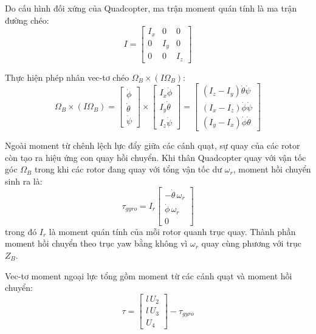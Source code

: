 \documentclass[12pt,a4paper]{report}
\begin{document}
Do cấu hình đối xứng của Quadcopter, ma trận moment quán tính là ma trận đường chéo:
\begin{equation}
I = \begin{bmatrix} I_x & 0 & 0 \\ 0 & I_y & 0 \\ 0 & 0 & I_z \end{bmatrix}
\end{equation}

Thực hiện phép nhân vec-tơ chéo $\Omega_B \times (I \Omega_B)$:
\begin{equation}
\Omega_B \times (I \Omega_B) = \begin{bmatrix} \dot{\phi} \\ \dot{\theta} \\ \dot{\psi} \end{bmatrix} \times \begin{bmatrix} I_x \dot{\phi} \\ I_y \dot{\theta} \\ I_z \dot{\psi} \end{bmatrix} = \begin{bmatrix} (I_z - I_y) \dot{\theta} \dot{\psi} \\ (I_x - I_z) \dot{\phi} \dot{\psi} \\ (I_y - I_x) \dot{\phi} \dot{\theta} \end{bmatrix}
\end{equation}

Ngoài moment từ chênh lệch lực đẩy giữa các cánh quạt, sự quay của các rotor còn tạo ra hiệu ứng con quay hồi chuyển. Khi thân Quadcopter quay với vận tốc góc $\Omega_B$ trong khi các rotor đang quay với tổng vận tốc dư $\omega_r$, moment hồi chuyển sinh ra là:
\begin{equation}
\tau_{gyro} = I_r \begin{bmatrix} -\dot{\theta} \, \omega_r \\[6pt] \dot{\phi} \, \omega_r \\[6pt] 0 \end{bmatrix}
\end{equation}
trong đó $I_r$ là moment quán tính của mỗi rotor quanh trục quay. Thành phần moment hồi chuyển theo trục yaw bằng không vì $\omega_r$ quay cùng phương với trục $Z_B$.

Vec-tơ moment ngoại lực tổng gồm moment từ các cánh quạt và moment hồi chuyển:
\begin{equation}
\tau = \begin{bmatrix} l \, U_2 \\[6pt] l \, U_3 \\[6pt] U_4 \end{bmatrix} - \tau_{gyro}
\end{equation}
\end{document}
